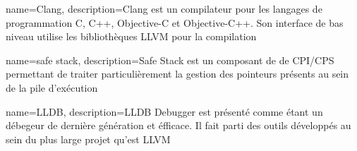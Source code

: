 {
	name={Clang},
	description={Clang est un compilateur pour les langages de programmation C, C++, Objective-C et Objective-C++. Son interface de bas niveau utilise les bibliothèques LLVM pour la compilation}
}

{
	name={safe stack},
	description={Safe Stack est un composant de de CPI/CPS permettant de traiter particulièrement la gestion des pointeurs présents au sein de la pile d'exécution}
}

{
	name={LLDB},
	description={LLDB Debugger est présenté comme étant un débegeur de dernière génération et éfficace. Il fait parti des outils développés au sein du plus large projet qu'est LLVM}
}





